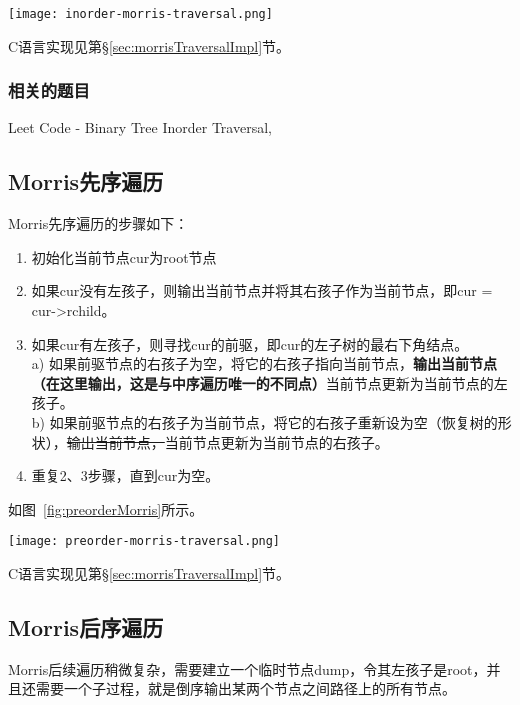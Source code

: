 \begin{center}
\texttt{[image: inorder-morris-traversal.png]} \\
\label{fig:inorderMorris}
\end{center}

C语言实现见第\S\ref{sec:morrisTraversalImpl}节。

\subsubsection{相关的题目}
\begindot
\item Leet Code - Binary Tree Inorder Traversal, 
\myenddot


\subsection{Morris先序遍历}
Morris先序遍历的步骤如下：
\begin{enumerate}
\item 初始化当前节点cur为root节点
\item 如果cur没有左孩子，则输出当前节点并将其右孩子作为当前节点，即cur = cur->rchild。
\item 如果cur有左孩子，则寻找cur的前驱，即cur的左子树的最右下角结点。\\
   a) 如果前驱节点的右孩子为空，将它的右孩子指向当前节点，\textbf{输出当前节点（在这里输出，这是与中序遍历唯一的不同点）}当前节点更新为当前节点的左孩子。\\
   b) 如果前驱节点的右孩子为当前节点，将它的右孩子重新设为空（恢复树的形状），\sout{输出当前节点，}当前节点更新为当前节点的右孩子。
\item 重复2、3步骤，直到cur为空。
\end{enumerate}
如图~\ref{fig:preorderMorris}所示。

\begin{center}
\texttt{[image: preorder-morris-traversal.png]} \\
\label{fig:preorderMorris}
\end{center}

C语言实现见第\S\ref{sec:morrisTraversalImpl}节。


\subsection{Morris后序遍历}
Morris后续遍历稍微复杂，需要建立一个临时节点dump，令其左孩子是root，并且还需要一个子过程，就是倒序输出某两个节点之间路径上的所有节点。

